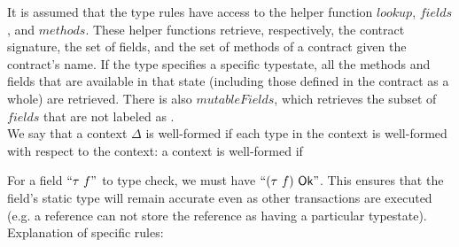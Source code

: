 \documentclass[runningheads,a4paper]{llncs}
\begin{document}
It is assumed that the type rules have access to the helper function $lookup$, $fields$, and $methods$. These helper functions retrieve, respectively, the contract signature, the set of fields, and the set of methods of a contract given the contract's name. If the type specifies a specific typestate, all the methods and fields that are available in that state (including those defined in the contract as a whole) are retrieved. There is also $mutableFields$, which retrieves the subset of $fields$ that are not labeled as \constS{}.\\

We say that a context $\Delta$ is well-formed if each type in the context is well-formed with respect to the context: a context is well-formed if 

\iffalse

For a field $``\tau\ f"$ to type check, we must have $``(\tau\ f)\ \okHelp"$. This ensures that the field's static type will remain accurate even as other transactions are executed (e.g. a \readonlyS{} reference can not store the reference as having a particular typestate). \\

Explanation of specific rules:
\end{document}
